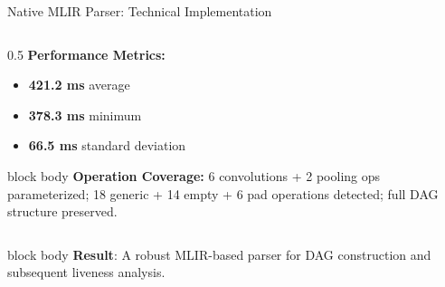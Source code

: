 \documentclass[10pt,aspectratio=169]{beamer}
\begin{document}
\begin{frame}{Native MLIR Parser: Technical Implementation}
\begin{columns}
\begin{column}{0.5\textwidth}
\vspace{0.15cm}
\textbf{Performance Metrics:}
\begin{itemize}
\small
\item \textbf{421.2 ms} average
\item \textbf{378.3 ms} minimum
\item \textbf{66.5 ms} standard deviation
\end{itemize}

\vspace{0.15cm}
\begin{beamercolorbox}[sep=0.2em,center,rounded=true,shadow=true]{block body}
\tiny
\textbf{Operation Coverage:} 6 convolutions + 2 pooling ops parameterized; 18 generic + 14 empty + 6 pad operations detected; full DAG structure preserved.
\end{beamercolorbox}
\end{column}
\end{columns}

\vspace{0.25cm}
\begin{beamercolorbox}[sep=0.3em,center,rounded=true,shadow=true]{block body}
\small
\textbf{Result}: A robust MLIR-based parser for DAG construction and subsequent liveness analysis.
\end{beamercolorbox}
\end{frame}

\end{document}
